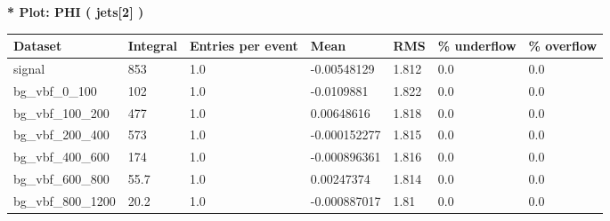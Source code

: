 \documentclass[a4paper, 10pt]{article}
\begin{document}
\textbf{* Plot: PHI ( jets[2] ) }\\
   \begin{table}[H]
  \begin{center}
    \begin{tabular}{|m{23.0mm}|m{23.0mm}|m{18.0mm}|m{19.0mm}|m{19.0mm}|m{19.0mm}|m{19.0mm}|}
      \hline
      {\cellcolor{yellow}         Dataset}& {\cellcolor{yellow}         Integral}& {\cellcolor{yellow}         Entries per event}& {\cellcolor{yellow}         Mean}& {\cellcolor{yellow}         RMS}& {\cellcolor{yellow}         \% underflow}& {\cellcolor{yellow}         \% overflow}\\
      \hline
      {\cellcolor{white}         signal}& {\cellcolor{white}         853}& {\cellcolor{white}         1.0}& {\cellcolor{white}         -0.00548129}& {\cellcolor{white}         1.812}& {\cellcolor{green}         0.0}& {\cellcolor{green}         0.0}\\
      \hline
      {\cellcolor{white}         bg\_vbf\_0\_100}& {\cellcolor{white}         102}& {\cellcolor{white}         1.0}& {\cellcolor{white}         -0.0109881}& {\cellcolor{white}         1.822}& {\cellcolor{green}         0.0}& {\cellcolor{green}         0.0}\\
      \hline
      {\cellcolor{white}         bg\_vbf\_100\_200}& {\cellcolor{white}         477}& {\cellcolor{white}         1.0}& {\cellcolor{white}         0.00648616}& {\cellcolor{white}         1.818}& {\cellcolor{green}         0.0}& {\cellcolor{green}         0.0}\\
      \hline
      {\cellcolor{white}         bg\_vbf\_200\_400}& {\cellcolor{white}         573}& {\cellcolor{white}         1.0}& {\cellcolor{white}         -0.000152277}& {\cellcolor{white}         1.815}& {\cellcolor{green}         0.0}& {\cellcolor{green}         0.0}\\
      \hline
      {\cellcolor{white}         bg\_vbf\_400\_600}& {\cellcolor{white}         174}& {\cellcolor{white}         1.0}& {\cellcolor{white}         -0.000896361}& {\cellcolor{white}         1.816}& {\cellcolor{green}         0.0}& {\cellcolor{green}         0.0}\\
      \hline
      {\cellcolor{white}         bg\_vbf\_600\_800}& {\cellcolor{white}         55.7}& {\cellcolor{white}         1.0}& {\cellcolor{white}         0.00247374}& {\cellcolor{white}         1.814}& {\cellcolor{green}         0.0}& {\cellcolor{green}         0.0}\\
      \hline
      {\cellcolor{white}         bg\_vbf\_800\_1200}& {\cellcolor{white}         20.2}& {\cellcolor{white}         1.0}& {\cellcolor{white}         -0.000887017}& {\cellcolor{white}         1.81}& {\cellcolor{green}         0.0}& {\cellcolor{green}         0.0}\\

\end{tabular}
\end{center}
\end{table}
\end{document}
